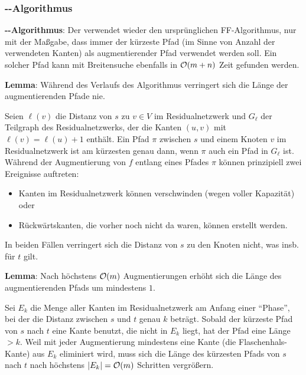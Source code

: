 \subsubsection{%
    --Algorithmus%
}

\textbf{--Algorithmus}:
Der  verwendet
wieder den ursprünglichen FF-Algorithmus, nur mit der Maßgabe, dass
immer der kürzeste Pfad (im Sinne von Anzahl der verwendeten Kanten) als augmentierender Pfad
verwendet werden soll.
Ein solcher Pfad kann mit Breitensuche ebenfalls in $\mathcal{O}(m + n)$ Zeit gefunden werden.

\linie

\textbf{Lemma}:
Während des Verlaufs des Algorithmus verringert sich die Länge der augmentierenden Pfade nie.

\begin{Beweis}
    Seien $\ell(v)$ die Distanz von $s$ zu $v \in V$ im Residualnetzwerk und
    $G_\ell$ der Teilgraph des Residualnetzwerks, der die Kanten $(u, v)$ mit
    $\ell(v) = \ell(u) + 1$ enthält.
    Ein Pfad $\pi$ zwischen $s$ und einem Knoten $v$ im Residualnetzwerk ist am kürzesten
    genau dann, wenn $\pi$ auch ein Pfad in $G_\ell$ ist.
    Während der Augmentierung von $f$ entlang eines Pfades $\pi$ können prinzipiell zwei Ereignisse
    auftreten:
    \begin{itemize}
        \item
        Kanten im Residualnetzwerk können verschwinden (wegen voller Kapazität) oder
        
        \item
        Rückwärtskanten, die vorher noch nicht da waren, können erstellt werden.
    \end{itemize}
    In beiden Fällen verringert sich die Distanz von $s$ zu den Knoten nicht,
    was insb. für $t$ gilt.
\end{Beweis}

\textbf{Lemma}:
Nach höchstens $\mathcal{O}(m)$ Augmentierungen erhöht sich die Länge des augmentierenden Pfads um
mindestens $1$.

\begin{Beweis}
    Sei $E_k$ die Menge aller Kanten im Residualnetzwerk am Anfang einer "`Phase"', bei der
    die Distanz zwischen $s$ und $t$ genau $k$ beträgt.
    Sobald der kürzeste Pfad von $s$ nach $t$ eine Kante benutzt, die nicht in $E_k$ liegt,
    hat der Pfad eine Länge $> k$.
    Weil mit jeder Augmentierung mindestens eine Kante (die Flaschenhals-Kante) aus $E_k$
    eliminiert wird, muss sich die Länge des kürzesten Pfads von $s$ nach $t$ nach höchstens
    $|E_k| = \mathcal{O}(m)$ Schritten vergrößern.
\end{Beweis}


